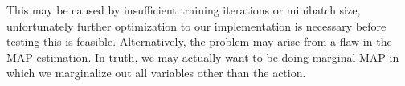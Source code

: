 \documentclass{article} %
\begin{document}
This may be caused by insufficient training iterations or minibatch size, 
unfortunately further optimization to our implementation is necessary before
testing this is feasible. Alternatively, the problem may arise from a flaw 
in the MAP estimation. In truth, we may actually want to be doing marginal MAP
in which we marginalize out all variables other than the action. 







\end{document}
